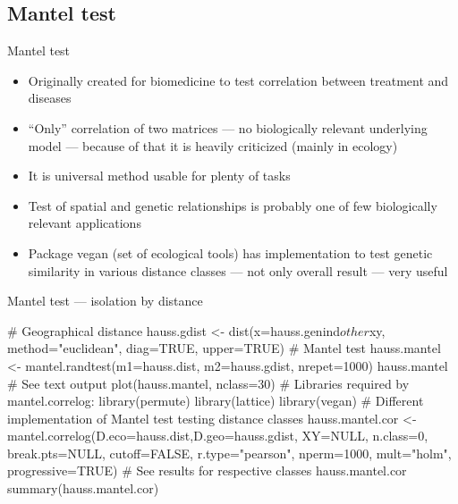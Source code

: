 \documentclass[compress, ucs, xelatex, 11pt, xcolor=svgnames,
	hyperref={
		bookmarks=true,
		unicode=true,
		colorlinks=true,
		pdftitle={Molecular data in R},
		plainpages=false,
		pdfauthor={Vojtech Zeisek},
		pdfsubject={Course about phylogeny and evolution in R},
		pdfcreator={XeLaTeX},
		pdfkeywords={R, evolution, phylogeny, molecular data},
		linkcolor=Tomato,
		anchorcolor=SaddleBrown,
		citecolor=Goldenrod,
		filecolor=DarkMagenta,
		menucolor=Sienna,
		urlcolor=DarkTurquoise,
		pdftex},
	url={hyphens, lowtilde} %
	]{beamer}
\begin{document}
\subsection{Mantel test}

\begin{frame}{Mantel test}
	\begin{itemize}
		\item Originally created for biomedicine to test correlation between treatment and diseases
		\item ``Only'' correlation of two matrices --- no biologically relevant underlying model --- because of that it is heavily criticized (mainly in ecology)
		\item It is universal method usable for plenty of tasks
		\item Test of spatial and genetic relationships is probably one of few biologically relevant applications
		\item Package vegan (set of ecological tools) has implementation to test genetic similarity in various distance classes --- not only overall result --- very useful
	\end{itemize}
\end{frame}

\begin{frame}[fragile]{Mantel test --- isolation by distance}
	\begin{spluscode}
    # Geographical distance
    hauss.gdist <- dist(x=hauss.genind$other$xy, method="euclidean",
      diag=TRUE, upper=TRUE)
    # Mantel test
    hauss.mantel <- mantel.randtest(m1=hauss.dist, m2=hauss.gdist,
      nrepet=1000)
    hauss.mantel # See text output
    plot(hauss.mantel, nclass=30)
    # Libraries required by mantel.correlog:
    library(permute)
    library(lattice)
    library(vegan)
    # Different implementation of Mantel test testing distance classes
    hauss.mantel.cor <- mantel.correlog(D.eco=hauss.dist,D.geo=hauss.gdist,
      XY=NULL, n.class=0, break.pts=NULL, cutoff=FALSE, r.type="pearson",
      nperm=1000, mult="holm", progressive=TRUE)
    # See results for respective classes
    hauss.mantel.cor
    summary(hauss.mantel.cor)
	\end{spluscode}
\end{frame}
\end{document}
